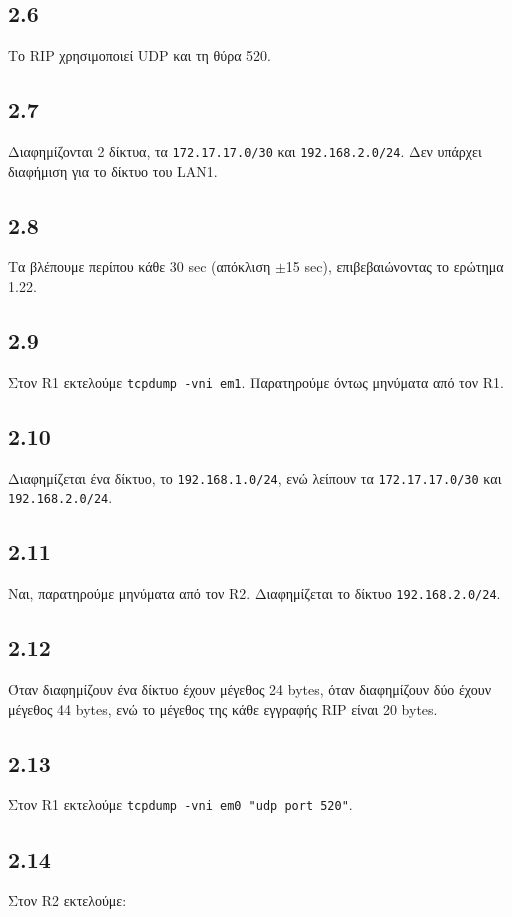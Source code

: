 \documentclass[a4paper, 12pt]{article}
\begin{document}
	\subsection*{2.6}
		Το RIP χρησιμοποιεί UDP και τη θύρα 520.

	\subsection*{2.7}
		Διαφημίζονται 2 δίκτυα, τα \verb|172.17.17.0/30| και \verb|192.168.2.0/24|. Δεν υπάρχει διαφήμιση για το δίκτυο του LAN1. 

	\subsection*{2.8}
		Τα βλέπουμε περίπου κάθε 30 sec (απόκλιση $\pm$15 sec), επιβεβαιώνοντας το ερώτημα 1.22. 

	\subsection*{2.9}
		Στον R1 εκτελούμε \verb|tcpdump -vni em1|. Παρατηρούμε όντως μηνύματα από τον R1. 

	\subsection*{2.10}
		Διαφημίζεται ένα δίκτυο, το \verb|192.168.1.0/24|, ενώ λείπουν τα \verb|172.17.17.0/30| και \verb|192.168.2.0/24|.

	\subsection*{2.11}
		Ναι, παρατηρούμε μηνύματα από τον R2. Διαφημίζεται το δίκτυο \verb|192.168.2.0/24|. 
		
	\subsection*{2.12}
		Όταν διαφημίζουν ένα δίκτυο έχουν μέγεθος 24 bytes, όταν διαφημίζουν δύο έχουν μέγεθος 44 bytes, ενώ το μέγεθος της κάθε εγγραφής RIP είναι 20 bytes. 

	\subsection*{2.13}
		Στον R1 εκτελούμε \verb|tcpdump -vni em0 "udp port 520"|.

	\subsection*{2.14}
		Στον R2 εκτελούμε:
		
\end{document}

